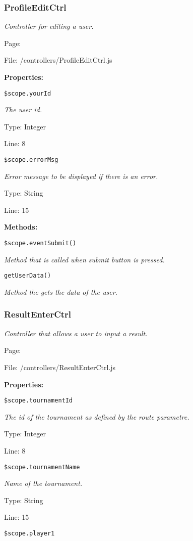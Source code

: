 \subsubsection{ProfileEditCtrl}\label{ProfileEditCtrl.js.doc}
\textit{Controller for editing a user.}

Page: \pageref{ProfileEditCtrl.js}

File: /controllers/ProfileEditCtrl.js

\textbf{Properties:}

\texttt{\$scope.yourId}

{\scriptsize
\textit{The user id.}

Type: Integer

Line: 8

}
\texttt{\$scope.errorMsg}

{\scriptsize
\textit{Error message to be displayed if there is an error.}

Type: String

Line: 15

}
\textbf{Methods:}

\texttt{\$scope.eventSubmit()}

{\scriptsize
\textit{Method that is called when submit button is pressed.}

}

\texttt{getUserData()}

{\scriptsize
\textit{Method the gets the data of the user.}

}

\subsubsection{ResultEnterCtrl}\label{ResultEnterCtrl.js.doc}
\textit{Controller that allows a user to input a result.}

Page: \pageref{ResultEnterCtrl.js}

File: /controllers/ResultEnterCtrl.js

\textbf{Properties:}

\texttt{\$scope.tournamentId}

{\scriptsize
\textit{The id of the tournament as defined by the route parametre.}

Type: Integer

Line: 8

}
\texttt{\$scope.tournamentName}

{\scriptsize
\textit{Name of the tournament.}

Type: String

Line: 15

}
\texttt{\$scope.player1}

